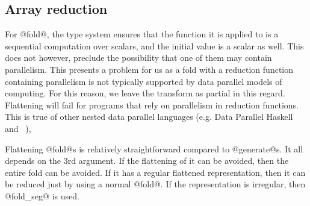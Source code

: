 \subsection{Array reduction}
For @fold@, the type system ensures that the function it is applied to is a sequential computation over scalars, and the initial value is a scalar as well. This does not however, preclude the possibility that one of them may contain parallelism. This presents a problem for us as a fold with a reduction function containing parallelism is not typically supported by data parallel models of computing. For this reason, we leave the transform as partial in this regard. Flattening will fail for programs that rely on parallelism in reduction functions. This is true of other nested data parallel languages (e.g. Data Parallel Haskell~\cite{Chakravarty:DPH} and \nesl~\cite{Blelloch:nesl1995}),

Flattening @fold@s is relatively straightforward compared to @generate@s. It all depends on the 3rd argument. If the flattening of it can be avoided, then the entire fold can be avoided. If it has a regular flattened representation, then it can be reduced just by using a normal @fold@. If the representation is irregular, then @fold_seg@ is used.



